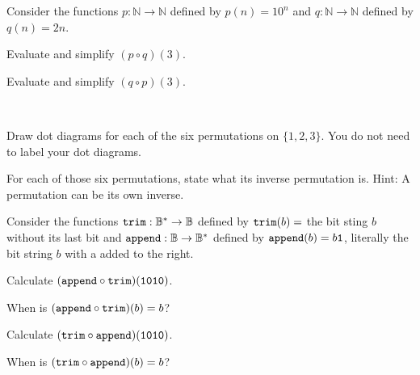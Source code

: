 \begin{exer}[\exerP] %
\label{exer_compose_fns_at3}
    Consider the functions $p:\mathbb{N} \to \mathbb{N}$ defined by $p(n) = 10^n$ and $q:\mathbb{N} \to \mathbb{N}$ defined by $q(n) = 2n$.
        \begin{exerpart}
            \item Evaluate and simplify $(p \circ q)(3)$.
            \item Evaluate and simplify $(q \circ p)(3)$.
        \end{exerpart}
\end{exer}

\begin{exer}[\exerU] %
\label{exer_symmetric_group3}
~
    \begin{exerpart}
        \item Draw dot diagrams for each of the six permutations on $\{1,2,3\}$.  You do not need to label your dot diagrams.
        \item For each of those six permutations, state what its inverse permutation is.  Hint: A permutation can be its own inverse.
    \end{exerpart}
\end{exer}

\begin{exer}[\exerU] %
\label{exer_compose_bs_functions}
    Consider the functions $\texttt{trim}: \mathbb{B}^* \to \mathbb{B}$ defined by $\texttt{trim}(b) =$ the bit sting $b$ without its last bit and $\texttt{append}:\mathbb{B} \to \mathbb{B}^*$ defined by $\texttt{append}(b)=b\texttt{1}$, literally the bit string $b$ with a  added to the right.
        \begin{exerpart}
            \item Calculate $(\texttt{append} \circ \texttt{trim})(\texttt{1010})$.
            \item When is $(\texttt{append} \circ \texttt{trim})(b)=b$?
            \item Calculate $(\texttt{trim} \circ \texttt{append})(\texttt{1010})$.
            \item When is $(\texttt{trim} \circ \texttt{append})(b)=b$?
        \end{exerpart}
\end{exer}

